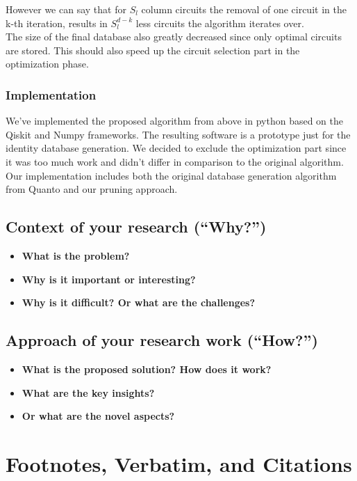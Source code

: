 However we can say that for $S_l$ column circuits the removal of one circuit in the k-th iteration, results in $S_l^{d-k}$ less circuits the algorithm iterates over.\\

The size of the final database also greatly decreased since only optimal circuits are stored. This should also speed up the circuit selection part in the optimization phase.

\subsubsection{Implementation}
We've implemented the proposed algorithm from above in python based on the Qiskit and Numpy frameworks. The resulting software is a prototype just for the identity database generation. We decided to exclude the optimization part since it was too much work and didn't differ in comparison to the original algorithm. Our implementation includes both the original database generation algorithm from Quanto and our pruning approach.

\subsection{Context of your research (``Why?'')}
\begin{itemize}
  \item \textbf{What is the problem?}
  \item \textbf{Why is it important or interesting?}
  \item \textbf{Why is it difficult? Or what are the challenges?}
\end{itemize}

\subsection{Approach of your research work (``How?'')}
\begin{itemize}
  \item \textbf{What is the proposed solution? How does it work?}
  \item \textbf{What are the key insights?}
  \item \textbf{Or what are the novel aspects?}
\end{itemize}

\section{Footnotes, Verbatim, and Citations}

